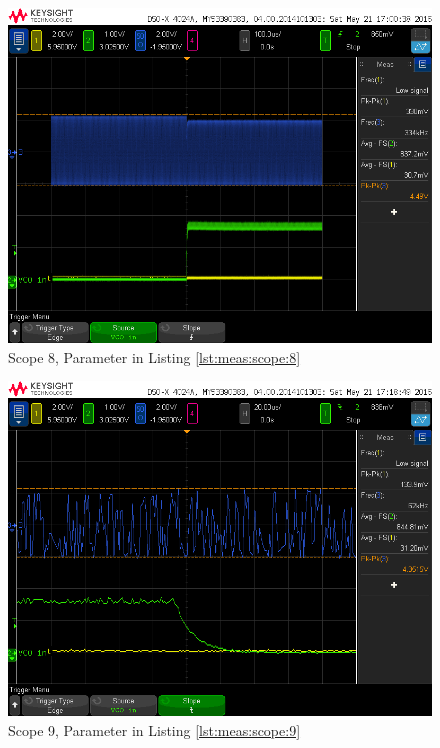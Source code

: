 \begin{figure}[h!tb]
    \centering
    \includegraphics[width=1\textwidth, trim=0mm 21mm 0mm 11mm, clip]{images/scopeShots/scope_8.png}
    \caption{Scope 8, Parameter in Listing \ref{lst:meas:scope:8}}
    \label{fig:meas:scope:8}
\end{figure}

\begin{figure}[h!tb]
    \centering
    \includegraphics[width=1\textwidth, trim=0mm 21mm 0mm 11mm, clip]{images/scopeShots/scope_9.png}
    \caption{Scope 9, Parameter in Listing \ref{lst:meas:scope:9}}
    \label{fig:meas:scope:9}
\end{figure}

